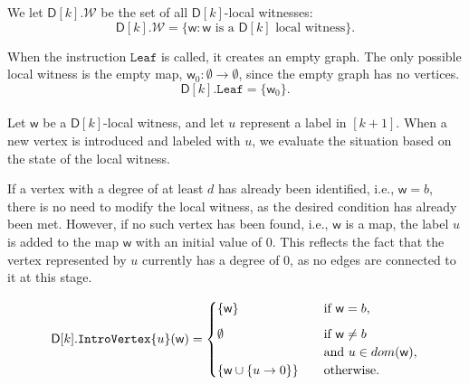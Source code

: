 \documentclass[11pt,a4paper]{article}
\newcommand{\treewidthvalue}{k}
\newcommand{\introvertexgeneric}[1]{\mathtt{IntroVertex}\{#1\}}
\newcommand{\initialsetgeneric}{\mathtt{Leaf}}
\newcommand{\initialsetgenericcore}{\mathtt{Leaf}}
\newcommand{\vertexone}{u}
\newcommand{\allwitnesses}{\mathcal{W}}
\newcommand{\awitness}{\mathsf{w}}
\newcommand{\dpcore}{\mathsf{D}}
\newcommand{\domain}{dom}
\newcommand{\maxdegreeparameter}{d}
\newcommand{\maxdegreefound}{b}
\begin{document}
{ We let $\dpcore[\treewidthvalue].\allwitnesses$ be the set of all $\dpcore[\treewidthvalue]$-local witnesses:
\[
\dpcore[\treewidthvalue].\allwitnesses = \{\awitness : \awitness \text{ is a } \dpcore[\treewidthvalue]\text{ local witness}\}.
\]

 When the instruction $\initialsetgenericcore$ is called, it creates an empty graph. The only possible local witness is the empty map, $\awitness_0:\emptyset\rightarrow \emptyset$, since the empty graph has no vertices.
\[
\dpcore[\treewidthvalue].\initialsetgeneric = \{\awitness_0\}.
\]
\\

 Let $\awitness$ be a $\dpcore[\treewidthvalue]$-local witness, and let $\vertexone$ represent a label in $[\treewidthvalue + 1]$. When a new vertex is introduced and labeled with $\vertexone$, we evaluate the situation based on the state of the local witness.

If a vertex with a degree of at least $\maxdegreeparameter$ has already been identified, i.e., $\awitness = \maxdegreefound$, there is no need to modify the local witness, as the desired condition has already been met. However, if no such vertex has been found, i.e., $\awitness$ is a map, the label $\vertexone$ is added to the map $\awitness$ with an initial value of 0. This reflects the fact that the vertex represented by $\vertexone$ currently has a degree of 0, as no edges are connected to it at this stage.

\[
\dpcore[\treewidthvalue].\introvertexgeneric{\vertexone}(\awitness) = \begin{cases}
    \{\awitness\} & \quad \text {if } \awitness = \maxdegreefound, \\[6pt]
    \emptyset & \quad \begin{array}[t]{@{}l@{}}
    \text{if } \awitness\neq \maxdegreefound\\
    \text{and } \vertexone\in\domain(\awitness),
    \end{array}\\[6pt]
    \{\awitness \cup \{\vertexone \to 0\}\} & \quad \text{otherwise.}
\end{cases}
\]
\\

}
\end{document}
